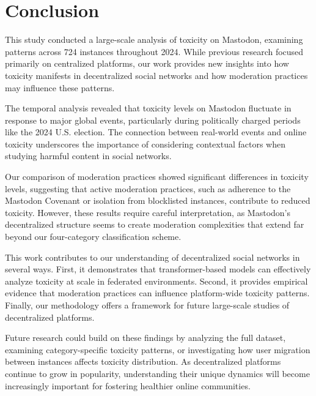 \chapter{Conclusion} \label{conclusion}

This study conducted a large-scale analysis of toxicity on Mastodon, examining patterns across 724 instances throughout 2024. While previous research focused primarily on centralized platforms, our work provides new insights into how toxicity manifests in decentralized social networks and how moderation practices may influence these patterns.

The temporal analysis revealed that toxicity levels on Mastodon fluctuate in response to major global events, particularly during politically charged periods like the 2024 U.S. election. The connection between real-world events and online toxicity underscores the importance of considering contextual factors when studying harmful content in social networks.

Our comparison of moderation practices showed significant differences in toxicity levels, suggesting that active moderation practices, such as adherence to the Mastodon Covenant or isolation from blocklisted instances, contribute to reduced toxicity. However, these results require careful interpretation, as Mastodon's decentralized structure seems to create moderation complexities that extend far beyond our four-category classification scheme.

This work contributes to our understanding of decentralized social networks in several ways. First, it demonstrates that transformer-based models can effectively analyze toxicity at scale in federated environments. Second, it provides empirical evidence that moderation practices can influence platform-wide toxicity patterns. Finally, our methodology offers a framework for future large-scale studies of decentralized platforms.

Future research could build on these findings by analyzing the full dataset, examining category-specific toxicity patterns, or investigating how user migration between instances affects toxicity distribution. As decentralized platforms continue to grow in popularity, understanding their unique dynamics will become increasingly important for fostering healthier online communities.